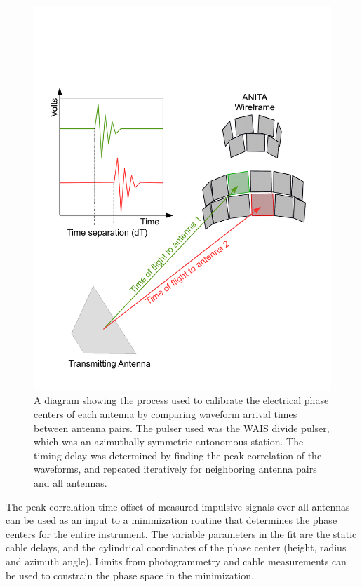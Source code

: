 \begin{figure}
	\centering
	\includegraphics[height=\textheight]{figures/phaseCenterCalib}
	\caption{A diagram showing the process used to calibrate the electrical phase centers of each antenna by comparing waveform arrival times between antenna pairs.  The pulser used was the WAIS divide pulser, which was an azimuthally symmetric autonomous station.  The timing delay was determined by finding the peak correlation of the waveforms, and repeated iteratively for neighboring antenna pairs and all antennas.}
	\label{fig:phaseCenterDiag}
\end{figure}	
		
	The peak correlation time offset of measured impulsive signals over all antennas can be used as an input to a minimization routine that determines the phase centers for the entire instrument.  The variable parameters in the fit are the static cable delays, and the cylindrical coordinates of the phase center (height, radius and azimuth angle).  Limits from photogrammetry and cable measurements can be used to constrain the phase space in the minimization.
		


